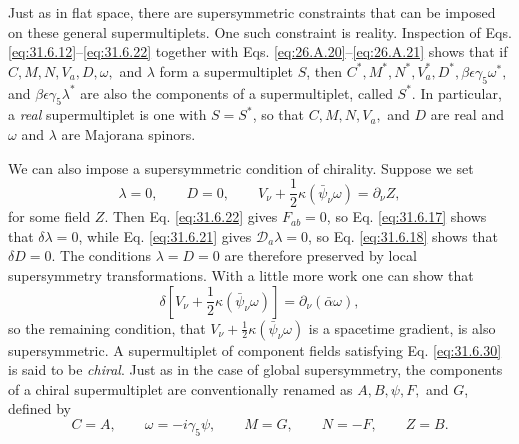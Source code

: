 Just as in flat space, there are supersymmetric constraints that can be
imposed on these general supermultiplets. One such constraint is
reality. Inspection of Eqs. \eqref{eq:31.6.12}--\eqref{eq:31.6.22}
together with Eqs. \eqref{eq:26.A.20}--\eqref{eq:26.A.21} shows that if
\(C,M,N,V_a,D,\omega,\) and \(\lambda\) form a supermultiplet \(S\),
then \(C^*,M^*,N^*,V_a^*,D^*,\beta\epsilon\gamma_5\omega^*,\) and
\(\beta\epsilon\gamma_5\lambda^*\) are also the components of a
supermultiplet, called \(S^*\). In particular, a \emph{real}
supermultiplet is one with \(S=S^*\), so that \(C,M,N,V_a,\) and \(D\)
are real and \(\omega\) and \(\lambda\) are Majorana spinors.

We can also impose a supersymmetric condition of chirality. Suppose we
set
\begin{equation}
  \lambda=0,\qquad D=0,\qquad
  V_\nu+\frac{1}{2}\kappa(\bar\psi_\nu\omega)=\partial_\nu Z,
  \tag{31.6.30}\label{eq:31.6.30}
\end{equation}
for some field \(Z\). Then Eq. \eqref{eq:31.6.22} gives \(F_{ab}=0\), so
Eq. \eqref{eq:31.6.17} shows that \(\delta\lambda=0\), while
Eq. \eqref{eq:31.6.21} gives \(\mathcal D_a\lambda=0\), so
Eq. \eqref{eq:31.6.18} shows that \(\delta D=0\). The conditions
\(\lambda=D=0\) are therefore preserved by local supersymmetry
transformations. With a little more work one can show that
\begin{equation}
  \delta\left[
    V_\nu+\frac{1}{2}\kappa(\bar\psi_\nu\omega)\right]
  =\partial_\nu(\bar\alpha\omega),
  \tag{31.6.31}\label{eq:31.6.31}
\end{equation}
so the remaining condition, that
\(V_\nu+\frac{1}{2}\kappa(\bar\psi_\nu\omega)\) is a spacetime gradient,
is also supersymmetric. A supermultiplet of component fields satisfying
Eq. \eqref{eq:31.6.30} is said to be \emph{chiral}. Just as in the case
of global supersymmetry, the components of a chiral supermultiplet are
conventionally renamed as \(A,B,\psi,F,\) and \(G\), defined by
\begin{equation}
  C=A,\qquad
  \omega=-i\gamma_5\psi,\qquad
  M=G,\qquad
  N=-F,\qquad
  Z=B.
  \tag{31.6.32}\label{eq:31.6.32}
\end{equation}

